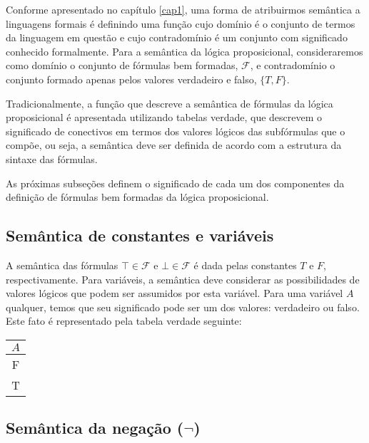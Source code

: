 Conforme apresentado no cap\'itulo \ref{cap1}, uma forma de
atribuirmos sem\^antica a linguagens formais \'e definindo uma
fun\c{c}\~ao cujo dom\'inio \'e o conjunto de termos da linguagem
em quest\~ao e cujo contradom\'inio \'e um conjunto com
significado conhecido formalmente. Para a sem\^antica da l\'ogica
proposicional, consideraremos como dom\'inio o conjunto de f\'ormulas
bem formadas, $\mathcal{F}$, e contradom\'inio o conjunto formado
apenas pelos valores verdadeiro e falso, $\{T,F\}$.

Tradicionalmente, a fun\c{c}\~ao que descreve a sem\^antica de
f\'ormulas da l\'ogica proposicional \'e apresentada utilizando
tabelas verdade, que descrevem o significado de conectivos em termos
dos valores l\'ogicos das subf\'ormulas que o comp\~oe, ou seja,
a sem\^antica deve ser definida de acordo com a estrutura da sintaxe
das f\'ormulas.

As pr\'oximas subse\c{c}\~oes definem o significado de
cada um dos componentes da defini\c{c}\~ao de f\'ormulas bem formadas
da l\'ogica proposicional.


\subsection{Sem\^antica de constantes e vari\'aveis}

A sem\^antica das f\'ormulas $\top\in\mathcal{F}$ e
$\bot\in\mathcal{F}$ \'e dada pelas constantes $T$ e $F$,
respectivamente. Para vari\'aveis, a sem\^antica deve considerar as
possibilidades de valores l\'ogicos que podem ser assumidos por esta
vari\'avel. Para uma vari\'avel $A$ qualquer, temos que seu
significado pode ser um dos valores: verdadeiro ou falso. Este fato
\'e representado pela tabela verdade seguinte:
\begin{table}[h]
  \begin{tabular}{|c|}
        \hline
        $A$\\
        \hline
         F \\
         \hline
         T \\ \hline
  \end{tabular}
  \centering
\end{table}


\subsection{Sem\^antica da nega\c{c}\~ao ($\neg$)}

